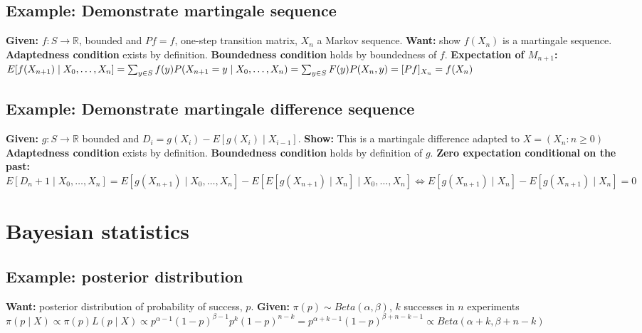 \documentclass[9pt]{extarticle}
\begin{document}
\subsection{Example: Demonstrate martingale sequence}
\textbf{Given:} $f:S\longrightarrow \mathbb{R}$, bounded and $Pf = f$, one-step transition matrix, $X_n$ a Markov sequence. \textbf{Want:} show $f(X_n)$ is a martingale sequence. \textbf{Adaptedness condition} exists by definition. \textbf{Boundedness condition} holds by boundedness of $f$. \textbf{Expectation of $M_{n+1}$:} $E[f(X_{n+1})\mid X_0,\dots,X_n] = \sum_{y\in S}f(y)P(X_{n+1}=y \mid X_0,\dots,X_n) = \sum_{y\in S}F(y)P(X_n,y) = \large [Pf\large ]_{X_n} = f(X_n)$

\subsection{Example: Demonstrate martingale difference sequence}
\textbf{Given:} $g: S \longrightarrow \mathbb{R}$ bounded and $D_i = g(X_i) - E[g(X_i)\mid X_{i-1}]$. \textbf{Show:} This is a martingale difference adapted to $X = (X_n:n\geq 0)$\\
\textbf{Adaptedness condition} exists by definition. \textbf{Boundedness condition} holds by definition of $g$. \textbf{Zero expectation conditional on the past:} $E[D_n+1 \mid X_0, \dots, X_n] = E[g(X_{n+1})\mid X_0, \dots, X_n] - E[E[g(X_{n+1})\mid X_n] \mid X_0, \dots, X_n] \Longleftrightarrow E[g(X_{n+1})\mid X_n] - E[g(X_{n+1})\mid X_n] = 0$ 



\section{Bayesian statistics}

\subsection{Example: posterior distribution}
\textbf{Want:} posterior distribution of probability of success, $p$. \textbf{Given:} $\pi(p) \sim Beta(\alpha, \beta)$, $k$ successes in $n$ experiments\\
$\pi(p \mid X) \propto \pi(p)L(p \mid X) \propto p^{\alpha-1}(1-p)^{\beta - 1}p^k(1-p)^{n-k} = p^{\alpha + k - 1}(1-p)^{\beta + n - k - 1} \propto Beta(\alpha + k, \beta + n - k)$
\end{document}

